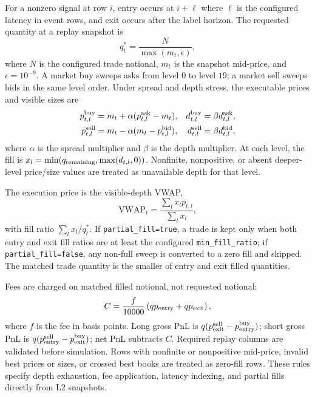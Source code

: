 \documentclass[conference]{IEEEtran}
\begin{document}
For a nonzero signal at row $i$, entry occurs at $i+\ell$ where $\ell$ is the configured latency in event rows, and exit occurs after the label horizon. The requested quantity at a replay snapshot is
\begin{equation}
q_t^*=\frac{N}{\max(m_t,\epsilon)},
\end{equation}
where $N$ is the configured trade notional, $m_t$ is the snapshot mid-price, and $\epsilon=10^{-9}$. A market buy sweeps asks from level $0$ to level $19$; a market sell sweeps bids in the same level order. Under spread and depth stress, the executable prices and visible sizes are
\begin{align}
p^{\rm buy}_{t,l}&=m_t+\alpha(p^{\rm ask}_{t,l}-m_t), &
d^{\rm buy}_{t,l}&=\beta d^{\rm ask}_{t,l},\\
p^{\rm sell}_{t,l}&=m_t-\alpha(m_t-p^{\rm bid}_{t,l}), &
d^{\rm sell}_{t,l}&=\beta d^{\rm bid}_{t,l},
\end{align}
where $\alpha$ is the spread multiplier and $\beta$ is the depth multiplier. At each level, the fill is $x_l=\min(q_{\rm remaining},\max(d_{t,l},0))$. Nonfinite, nonpositive, or absent deeper-level price/size values are treated as unavailable depth for that level.

The execution price is the visible-depth VWAP,
\begin{equation}
\mathrm{VWAP}_t=\frac{\sum_l x_l p_{t,l}}{\sum_l x_l},
\end{equation}
with fill ratio $\sum_l x_l/q_t^*$. If \texttt{partial\_fill=true}, a trade is kept only when both entry and exit fill ratios are at least the configured \texttt{min\_fill\_ratio}; if \texttt{partial\_fill=false}, any non-full sweep is converted to a zero fill and skipped. The matched trade quantity is the smaller of entry and exit filled quantities.

Fees are charged on matched filled notional, not requested notional:
\begin{equation}
C=\frac{f}{10000}\left(q p_{\rm entry}+q p_{\rm exit}\right),
\end{equation}
where $f$ is the fee in basis points. Long gross PnL is $q(p_{\rm exit}^{\rm sell}-p_{\rm entry}^{\rm buy})$; short gross PnL is $q(p_{\rm entry}^{\rm sell}-p_{\rm exit}^{\rm buy})$; net PnL subtracts $C$. Required replay columns are validated before simulation. Rows with nonfinite or nonpositive mid-price, invalid best prices or sizes, or crossed best books are treated as zero-fill rows. These rules specify depth exhaustion, fee application, latency indexing, and partial fills directly from L2 snapshots.
\end{document}
